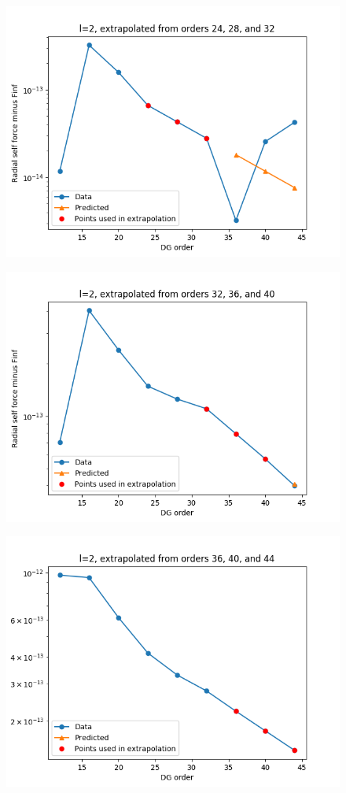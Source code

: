 \documentclass{article}
\begin{document}
\begin{figure}
  \includegraphics{extrapolate7t632l2i3}
\end{figure}
\begin{figure}
  \includegraphics{extrapolate7t632l2i5}
\end{figure}
\begin{figure}
  \includegraphics{extrapolate7t634l2i6}
\end{figure}
\end{document}
